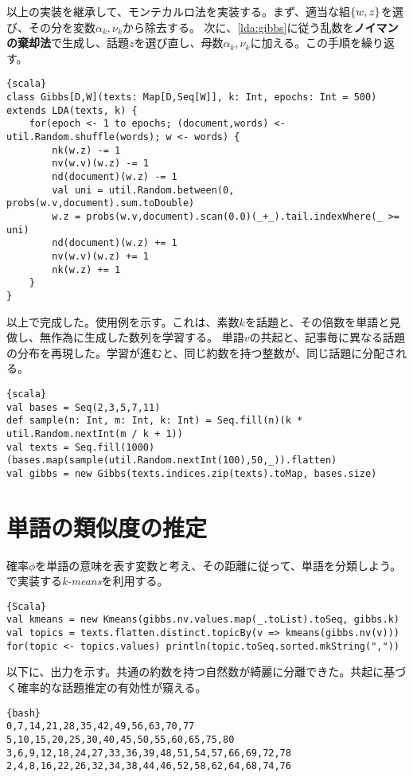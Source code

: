 \documentclass[10pt,a4paper]{book}
\begin{document}
以上の実装を継承して、モンテカルロ法を実装する。まず、適当な組$\seq{w,z}$を選び、その分を変数$\alpha_k,\nu_k$から除去する。
次に、\eqref{lda:gibbs}に従う乱数を\textbf{ノイマンの棄却法}で生成し、話題$z$を選び直し、母数$\alpha_k,\nu_k$に加える。この手順を繰り返す。

\begin{Verbatim}{scala}
class Gibbs[D,W](texts: Map[D,Seq[W]], k: Int, epochs: Int = 500) extends LDA(texts, k) {
	for(epoch <- 1 to epochs; (document,words) <- util.Random.shuffle(words); w <- words) {
		nk(w.z) -= 1
		nv(w.v)(w.z) -= 1
		nd(document)(w.z) -= 1
		val uni = util.Random.between(0, probs(w.v,document).sum.toDouble)
		w.z = probs(w.v,document).scan(0.0)(_+_).tail.indexWhere(_ >= uni)
		nd(document)(w.z) += 1
		nv(w.v)(w.z) += 1
		nk(w.z) += 1
	}
}
\end{Verbatim}

以上で完成した。使用例を示す。これは、素数$k$を話題と、その倍数を単語と見做し、無作為に生成した数列を学習する。
単語$v$の共起と、記事毎に異なる話題の分布を再現した。学習が進むと、同じ約数を持つ整数が、同じ話題に分配される。

\begin{Verbatim}{scala}
val bases = Seq(2,3,5,7,11)
def sample(n: Int, m: Int, k: Int) = Seq.fill(n)(k * util.Random.nextInt(m / k + 1)) 
val texts = Seq.fill(1000)(bases.map(sample(util.Random.nextInt(100),50,_)).flatten)
val gibbs = new Gibbs(texts.indices.zip(texts).toMap, bases.size)
\end{Verbatim}

\section{単語の類似度の推定}

確率$\phi$を単語の意味を表す変数と考え、その距離に従って、単語を分類しよう。で実装する\textit{k-means}を利用する。

\begin{Verbatim}{Scala}
val kmeans = new Kmeans(gibbs.nv.values.map(_.toList).toSeq, gibbs.k)
val topics = texts.flatten.distinct.topicBy(v => kmeans(gibbs.nv(v)))
for(topic <- topics.values) println(topic.toSeq.sorted.mkString(","))
\end{Verbatim}

以下に、出力を示す。共通の約数を持つ自然数が綺麗に分離できた。共起に基づく確率的な話題推定の有効性が窺える。

\begin{Verbatim}{bash}
0,7,14,21,28,35,42,49,56,63,70,77
5,10,15,20,25,30,40,45,50,55,60,65,75,80
3,6,9,12,18,24,27,33,36,39,48,51,54,57,66,69,72,78
2,4,8,16,22,26,32,34,38,44,46,52,58,62,64,68,74,76
\end{Verbatim}
\end{document}
